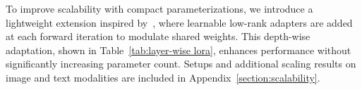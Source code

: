 To improve scalability with compact parameterizations, we introduce a lightweight extension inspired by~\citet{bae2025relaxed}, where learnable low-rank adapters are added at each forward iteration to modulate shared weights. This depth-wise adaptation, shown in Table~\ref{tab:layer-wise lora}, enhances performance without significantly increasing parameter count. Setups and additional scaling results on image and text modalities are included in Appendix~\ref{section:scalability}.